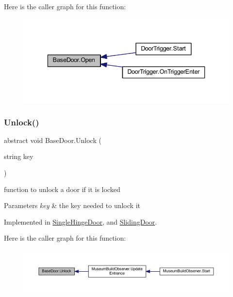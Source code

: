 Here is the caller graph for this function\+:
\nopagebreak
\begin{figure}[H]
\begin{center}
\leavevmode
\includegraphics[width=336pt]{class_base_door_a418df6f73cc5c56b6989c0512a6a909b_icgraph}
\end{center}
\end{figure}
\mbox{\label{class_base_door_a1fe85317a4742aec4d03deb7c0d52fd2}} 
\subsubsection{\texorpdfstring{Unlock()}{Unlock()}}
{\footnotesize\ttfamily abstract void Base\+Door.\+Unlock (\begin{DoxyParamCaption}\item[{string}]{key }\end{DoxyParamCaption})\hspace{0.3cm}{\ttfamily [pure virtual]}}



function to unlock a door if it is locked 


\begin{DoxyParams}{Parameters}
{\em key} & the key needed to unlock it\\
\hline
\end{DoxyParams}


Implemented in \mbox{\hyperlink{class_single_hinge_door_a130d674b08d4b9e8028b08ef2084ab77}{Single\+Hinge\+Door}}, and \mbox{\hyperlink{class_sliding_door_a259817872880d475d54ba9721a6db5cc}{Sliding\+Door}}.

Here is the caller graph for this function\+:
\nopagebreak
\begin{figure}[H]
\begin{center}
\leavevmode
\includegraphics[width=350pt]{class_base_door_a1fe85317a4742aec4d03deb7c0d52fd2_icgraph}
\end{center}
\end{figure}
\mbox{\label{class_base_door_aae09177b7a5578ede6d44f758551684e}} 
